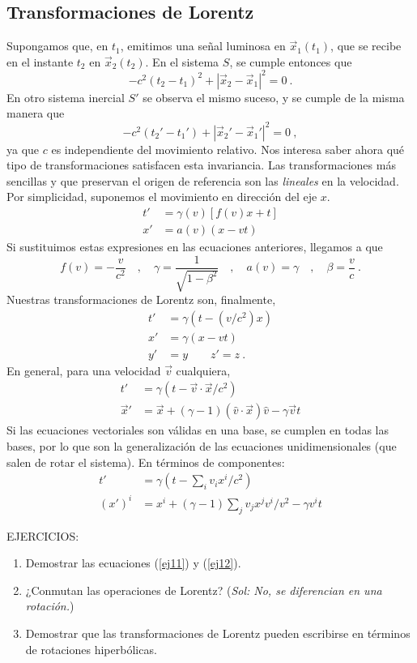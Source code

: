 \subsection{Transformaciones de Lorentz}
Supongamos que, en $t_1$, emitimos una señal luminosa en $\vec{x}_1(t_1)$, que se recibe en el instante $t_2$ en $\vec{x}_2(t_2)$. En el sistema $S$, se cumple entonces que 
$$
-c^2(t_2-t_1)^2 + |\vec{x}_2-\vec{x}_1|^2 = 0 \ .
$$
En otro sistema inercial $S'$ se observa el mismo suceso, y se cumple de la misma manera que
$$
-c^2(t_2'-t_1') + |\vec{x}_2' - \vec{x}_1'|^2 = 0 \ ,
$$
ya que $c$ es independiente del movimiento relativo. Nos interesa saber ahora qué tipo de transformaciones satisfacen esta invariancia. Las transformaciones más sencillas y que preservan el origen de referencia son las \emph{lineales} en la velocidad. Por simplicidad, suponemos el movimiento en dirección del eje $x$. 
\begin{align*}
    t' &= \gamma (v)[f(v)x+t] \\
    x' &= a(v)(x-vt) 
\end{align*}
Si sustituimos estas expresiones en las ecuaciones anteriores, llegamos a que
$$
f(v) = -\frac{v}{c^2} \quad , \quad \gamma = \frac{1}{\sqrt{1-\beta^2}} \quad , \quad a(v)=\gamma \quad , \quad \beta = \frac{v}{c} \ .
$$
Nuestras transformaciones de Lorentz son, finalmente, 
\begin{align} 
    t' &= \gamma  ( t - (v/c^2)x   )\\
    x' &= \gamma (x - vt) \\
    y' &= y \qquad z' = z \ .
\end{align}
En general, para una velocidad $\vec{v}$ cualquiera, 
\begin{align}
    t' &= \gamma (t - \vec{v}\cdot \vec{x} / c^2)\\
    \vec{x}' &= \vec{x} + (\gamma -1) (\hat{v}\cdot \vec{x})\hat{v} - \gamma \vec{v} t
\end{align}
Si las ecuaciones vectoriales son válidas en una base, se cumplen en todas las bases, por lo que son la generalización de las ecuaciones unidimensionales (que salen de rotar el sistema). En términos de componentes:
\begin{align}  
    t'     &= \gamma \left ( t - \sum_i v_i x^i /c^2 \right ) \label{ej11} \\ 
    (x')^i &= x^i + (\gamma-1) \sum_j v_j x^j v^i /v^2 - \gamma v^i t \label{ej12}
\end{align}
\begin{mybox}EJERCICIOS:
    \begin{enumerate}
        \item Demostrar las ecuaciones (\ref{ej11}) y (\ref{ej12}).
        \item ¿Conmutan las operaciones de Lorentz? (\emph{Sol: No, se diferencian en una rotación.})
        \item Demostrar que las transformaciones de Lorentz pueden escribirse en términos de rotaciones hiperbólicas.
    \end{enumerate}
\end{mybox}
\newpage
